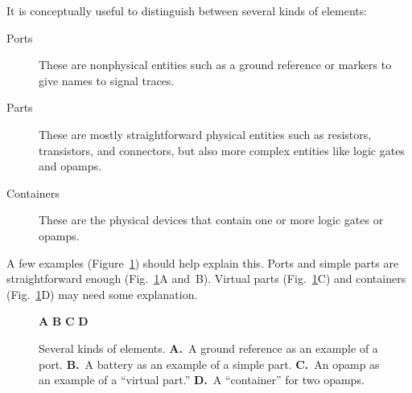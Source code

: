 \documentclass[11pt]{report}
\def\subfig#1#2{{\sf\small\bfseries#1}\raisebox{-.2in}{\raisebox{-.5\height}{\texttt{[image: \#2]}}}}
\begin{document}
It is conceptually useful to distinguish between several kinds of
elements:
\begin{description}
  \item[Ports] These are nonphysical entities such as a ground
    reference or markers to give names to signal traces.
    \item[Parts] These are mostly straightforward physical entities such as resistors,
      transistors, and connectors, but also more complex entities like
      logic gates and opamps.
    \item[Containers] These are the physical devices that contain
      one or more logic gates or opamps.
\end{description}

A few examples (Figure~\ref{parteg}) should help explain this. Ports
and simple parts are straightforward enough (Fig.~\ref{parteg}A
and~B). Virtual parts (Fig.~\ref{parteg}C) and containers
(Fig.~\ref{parteg}D) may need some explanation.

\begin{figure}[h]
  \mbox{}\hfill
  \subfig{A}{ug-ground}
  \hfill
  \subfig{B}{ug-battery}
  \hfill
  \subfig{C}{ug-opamp}
  \hfill
  \subfig{D}{ug-opamp-cont}
  \hfill\mbox{}
  \caption{Several kinds of elements. {\bf A.}~A ground reference as
    an example of a port. {\bf B.}~A battery as an example of a simple
    part. {\bf C.}~An opamp as an example of a ``virtual part.'' {\bf
      D.}~A ``container'' for two opamps.}\label{parteg}
\end{figure}
\end{document}
